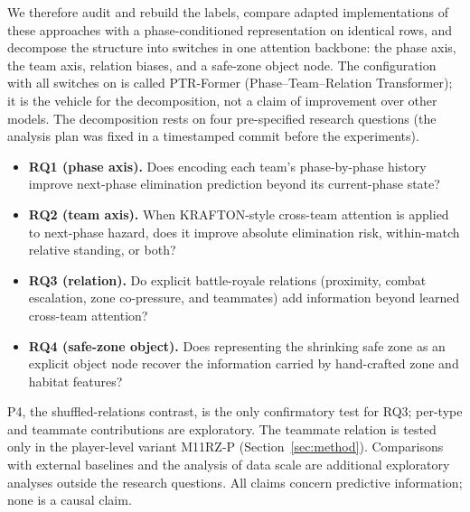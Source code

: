 We therefore audit and rebuild the labels, compare adapted implementations of these approaches with a phase-conditioned representation on identical rows, and decompose the structure into switches in one attention backbone: the phase axis, the team axis, relation biases, and a safe-zone object node. The configuration with all switches on is called PTR-Former (Phase--Team--Relation Transformer); it is the vehicle for the decomposition, not a claim of improvement over other models. The decomposition rests on four pre-specified research questions (the analysis plan was fixed in a timestamped commit before the experiments).
\begin{itemize}
\item[] \textbf{RQ1 (phase axis).} Does encoding each team's phase-by-phase history improve next-phase elimination prediction beyond its current-phase state?
\item[] \textbf{RQ2 (team axis).} When KRAFTON-style cross-team attention is applied to next-phase hazard, does it improve absolute elimination risk, within-match relative standing, or both?
\item[] \textbf{RQ3 (relation).} Do explicit battle-royale relations (proximity, combat escalation, zone co-pressure, and teammates) add information beyond learned cross-team attention?
\item[] \textbf{RQ4 (safe-zone object).} Does representing the shrinking safe zone as an explicit object node recover the information carried by hand-crafted zone and habitat features?
\end{itemize}
P4, the shuffled-relations contrast, is the only confirmatory test for RQ3; per-type and teammate contributions are exploratory.
The teammate relation is tested only in the player-level variant M11RZ-P (Section~\ref{sec:method}).
Comparisons with external baselines and the analysis of data scale are additional exploratory analyses outside the research questions. All claims concern predictive information; none is a causal claim.

